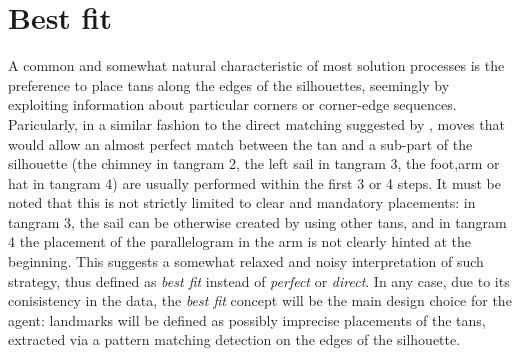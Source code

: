 \documentclass[a4paper,singleside,12pt]{report} %
\begin{document}
	\section*{Best fit}
	A common and somewhat natural characteristic of most solution processes is the preference to
	place tans along the edges of the silhouettes, seemingly by exploiting information about particular
	corners or corner-edge sequences. Paricularly, in a similar fashion to the direct matching
	suggested by \cite{heuristic}, moves that would allow an almost perfect match between the tan
	and a sub-part of the silhouette (the chimney in tangram 2, the left sail in tangram 3, the
	foot,arm or hat in tangram 4) are usually performed within the first 3 or 4 steps. It must be noted
	that this is not strictly limited to clear and mandatory placements: in tangram 3, the sail can be
	otherwise created by using other tans, and in tangram 4 the placement of the parallelogram in
	the arm is not clearly hinted at the beginning. This suggests a somewhat relaxed and noisy interpretation
	of such strategy, thus defined as \textit{best fit} instead of \textit{perfect} or
	\textit{direct}. In any case, due to its conisistency in the data, the \textit{best fit} concept will be the main design choice for the
	agent: landmarks will be defined as possibly imprecise placements of the tans, extracted via a pattern matching
	detection on the edges of the silhouette. 
\end{document}

